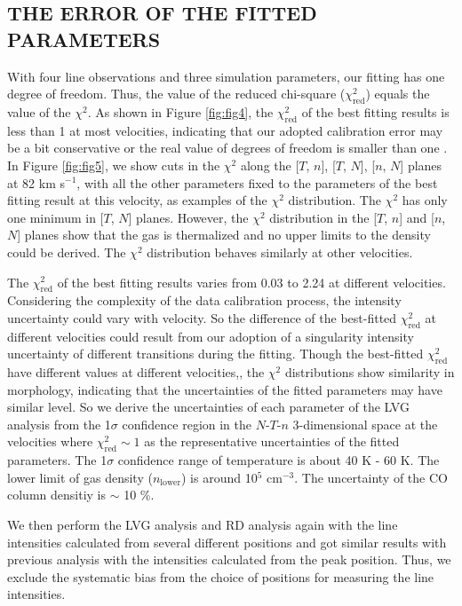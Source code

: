 \subsection{THE ERROR OF THE FITTED PARAMETERS}

With four line observations and three simulation parameters, our fitting has one degree of freedom. Thus, the value of the reduced chi-square ($\chi^2_{\mathrm{red}}$) equals the value of the $\chi^2$. As shown in Figure \ref{fig:fig4}, the $\chi^2_{\mathrm{red}}$ of the best fitting results is less than 1 at most velocities, indicating that our adopted calibration error may be a bit conservative or the real value of degrees of freedom is smaller than one \citep{2010arXiv1012.3754A}. In Figure \ref{fig:fig5}, we show cuts in the $\chi^2$ along the [$T$, $n$], [$T$, $N$], [$n$, $N$] planes at 82 km s$^{-1}$, with all the other parameters fixed to the parameters of the best fitting result at this velocity, as examples of the $\chi^2$ distribution. The $\chi^2$ has only one minimum in [$T$, $N$] planes. However, the $\chi^2$ distribution in the [$T$, $n$] and [$n$, $N$] planes show that the gas is thermalized and no upper limits to the density could be derived. The $\chi^2$ distribution behaves similarly at other velocities. 

The $\chi^2_{\mathrm{red}}$ of the best fitting results varies from 0.03 to 2.24 at different velocities. Considering the complexity of the data calibration process, the intensity uncertainty could vary with velocity. So the difference of the best-fitted $\chi^2_{\mathrm{red}}$ at different velocities could result from our adoption of a singularity intensity uncertainty of different transitions during the fitting. Though the best-fitted $\chi^2_{\mathrm{red}}$ have different values at different velocities,, the $\chi^2$ distributions show similarity in morphology, indicating that the uncertainties of the fitted parameters may have similar level. So we derive the uncertainties of each parameter of the LVG analysis from the 1$\sigma$ confidence region in the $N$-$T$-$n$ 3-dimensional space at the velocities where $\chi^2_{\mathrm{red}} \sim 1$ as the representative uncertainties of the fitted parameters. The 1$\sigma$ confidence range of temperature is about 40 K - 60 K. The lower limit of gas density ($n_{\mathrm{lower}}$) is around 10$^5$ cm$^{-3}$. The uncertainty of the CO column densitiy is $\sim$ 10 \%. 

We then perform the LVG analysis and RD analysis again with the line intensities calculated from several different positions and got similar results with previous analysis with the intensities calculated from the peak position. Thus, we exclude the systematic bias from the choice of positions for measuring the line intensities.

